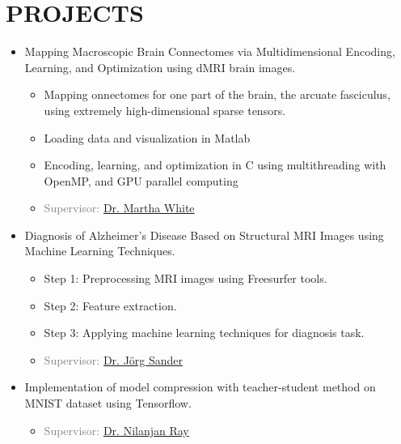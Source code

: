 \section{PROJECTS}
\vspace{0.3em}
	\begin{itemize}

		\item Mapping Macroscopic Brain Connectomes via
		Multidimensional Encoding, Learning, and Optimization using dMRI brain images.
		\begin{itemize}
			\item Mapping onnectomes for one
			part of the brain, the arcuate fasciculus, using extremely high-dimensional sparse tensors.
			\item Loading data and visualization in Matlab
			\item Encoding, learning, and optimization in C using multithreading with OpenMP, and GPU parallel computing
			\item \textcolor{gray}{Supervisor: \href{http://webdocs.cs.ualberta.ca/~whitem/}{Dr. Martha White}}
		\end{itemize}

		\item Diagnosis of Alzheimer’s Disease Based on Structural MRI Images using Machine Learning Techniques.
		\begin{itemize}
			\item Step 1: Preprocessing MRI images using Freesurfer tools.
			\item Step 2: Feature extraction.
			\item Step 3: Applying machine learning techniques for diagnosis task.
			\item \textcolor{gray}{Supervisor: \href{http://webdocs.cs.ualberta.ca/~joerg/}{Dr. Jörg Sander}}
			
		\end{itemize}
	
		\item Implementation of model compression with teacher-student method on MNIST dataset using Tensorflow.
		\begin{itemize}
			\item \textcolor{gray}{Supervisor: \href{https://webdocs.cs.ualberta.ca/~nray1/}{Dr. Nilanjan Ray}}
		\end{itemize}
		

\end{itemize}
